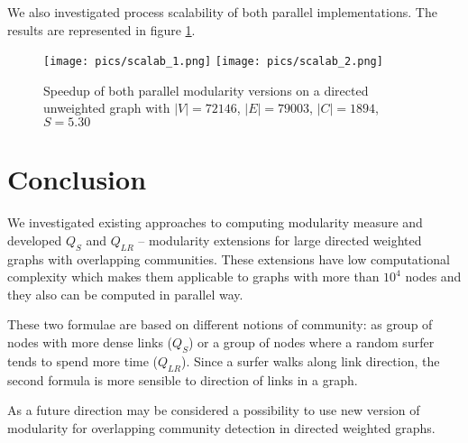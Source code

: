 \documentclass[a4paper,twocolumn]{article}
\begin{document}
We also investigated process scalability of both parallel implementations. The results are represented in figure \ref{figure_paral_scal}.

\begin{figure}[h!]
\caption{Speedup of both parallel modularity versions on a directed unweighted graph with $|V|=72146$, $|E|=79003$, $|C|=1894$, $S=5.30$}
\label{figure_paral_scal}
\texttt{[image: pics/scalab\_1.png]}
\texttt{[image: pics/scalab\_2.png]}
\end{figure}

\section{Conclusion}

We investigated existing approaches to computing modularity measure and developed $Q_S$ and $Q_{LR}$ -- modularity extensions for large directed weighted graphs with overlapping communities. These extensions have low computational complexity which makes them applicable to graphs with more than $10^4$ nodes and they also can be computed in parallel way.

These two formulae are based on different notions of community: as group of nodes with more dense links ($Q_S$) or a group of nodes where a random surfer tends to spend more time ($Q_{LR}$). Since a surfer walks along link direction, the second formula is more sensible to direction of links in a graph.

As a future direction may be considered a possibility to use new version of modularity for overlapping community detection in directed weighted graphs.

\printbibliography
\end{document}
